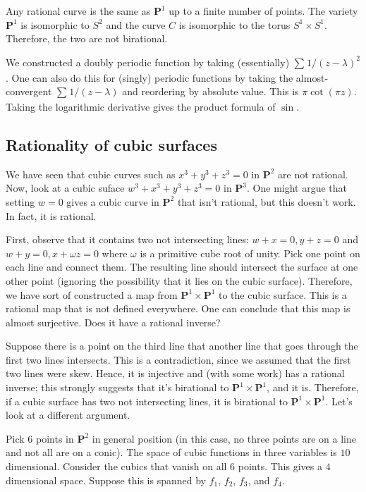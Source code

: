 \documentclass [11 pt, oneside] {article}
\begin{document}
Any rational curve is the same as $\mathbf{P}^1$ up to a finite number of points. The variety $\mathbf{P}^1$ is isomorphic to $S^2$ and the curve $C$ is isomorphic to the torus $S^1\times S^1$. Therefore, the two are not birational.

\begin{remark}
	We constructed a doubly periodic function by taking (essentially) $\sum_{}^{} 1/(z-\lambda)^2 $. One can also do this for (singly) periodic functions by taking the almost-convergent $\sum_{}^{} 1/(z-\lambda)$ and reordering by absolute value. This is $\pi\cot (\pi z)$. Taking the logarithmic derivative gives the product formula of $\sin$.
\end{remark}

\subsection{Rationality of cubic surfaces}
We have seen that cubic curves such as $x^3+y^3+z^3=0$ in $\mathbf{P}^2$ are not rational. Now, look at a cubic suface $w^3+x^3+y^3+z^3= 0$ in $\mathbf{P}^3$. One might argue that setting $w=0$ gives a cubic curve in $\mathbf{P}^2$ that isn't rational, but this doesn't work. In fact, it is rational.

First, observe that it contains two not intersecting lines: $w+x=0, y+z=0$ and $w+y=0, x+\omega z=0$ where $\omega$ is a primitive cube root of unity. Pick one point on each line and connect them. The resulting line should intersect the surface at one other point (ignoring the possibility that it lies on the cubic surface). Therefore, we have sort of constructed a map from $\mathbf{P}^1\times \mathbf{P}^1$ to the cubic surface. This is a rational map that is not defined everywhere. One can conclude that this map is almost surjective. Does it have a rational inverse?

Suppose there is a point on the third line that another line that goes through the first two lines intersects. This is a contradiction, since we assumed that the first two lines were skew. Hence, it is injective and (with some work) has a rational inverse; this strongly suggests that it's birational to $ \mathbf{P}^1\times \mathbf{P}^1$, and it is. Therefore, if a cubic surface has two not intersecting lines, it is birational to $\mathbf{P}^1\times \mathbf{P}^1$. Let's look at a different argument.

Pick $6$ points in $\mathbf{P}^2$ in general position (in this case, no three points are on a line and not all are on a conic). The space of cubic functions in three variables is $10$ dimensional. Consider the cubics that vanish on all $6$ points. This gives a $4$ dimensional space. Suppose this is spanned by $f_1$, $f_2$, $f_3$, and $f_4$.
\end{document}
